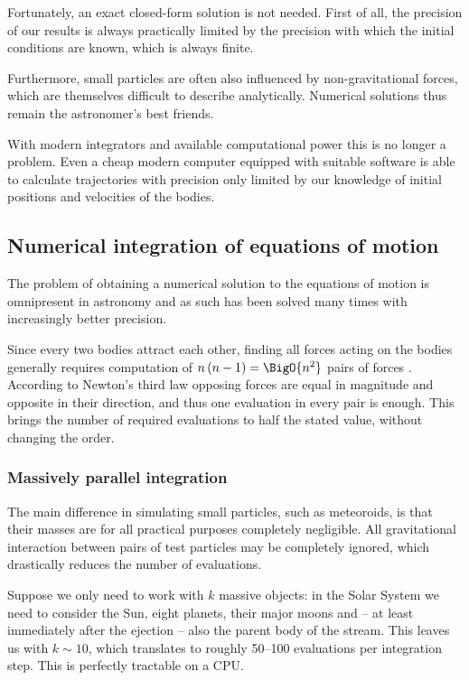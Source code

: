         Fortunately, an exact closed-form solution is not needed. First of all, the precision of our results
        is always practically limited by the precision with which the initial conditions are known,
        which is always finite.

        Furthermore, small particles are often also influenced by non-gravitational forces,
        which are themselves difficult to describe analytically.
        Numerical solutions thus remain the astronomer's best friends.

        With modern integrators and available computational power this is no longer a problem.
        Even a cheap modern computer equipped with suitable software is able to calculate trajectories
        with precision only limited by our knowledge of initial positions and velocities of the bodies.


    \subsection{Numerical integration of equations of motion} \label{msi}
        The problem of obtaining a numerical solution to the equations of motion is omnipresent
        in astronomy and as such has been solved many times with increasingly better precision.

        Since every two bodies attract each other, finding all forces acting on the bodies generally
        requires computation of $n\left(n - 1\right) = \BigO{n^2}$ pairs of forces \cite{???}.
        According to Newton's third law opposing forces are equal in magnitude and opposite in their direction,
        and thus one evaluation in every pair is enough. This brings the number of required evaluations to half the stated value,
        without changing the order.

        \subsubsection{Massively parallel integration} \label{msip}
            The main difference in simulating small particles, such as meteoroids,
            is that their masses are for all practical purposes completely negligible.
            All gravitational interaction between pairs of test particles may be completely ignored,
            which drastically reduces the number of evaluations.

            Suppose we only need to work with $k$ massive objects:
            in the Solar System we need to consider the Sun, eight planets, their major moons
            and -- at least immediately after the ejection -- also the parent body of the stream.
            This leaves us with $k \sim 10$, which translates to roughly 50--100 evaluations per integration step.
            This is perfectly tractable on a CPU.

